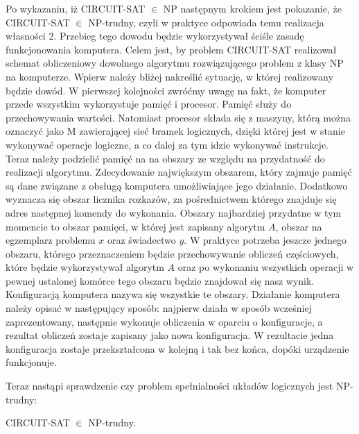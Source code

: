 Po wykazaniu, iż CIRCUIT-SAT $\in$ NP następnym krokiem jest pokazanie, że CIRCUIT-SAT $\in$ NP-trudny, czyli w praktyce odpowiada temu realizacja własności 2. Przebieg tego dowodu będzie wykorzystywał ściśle zasadę funkcjonowania komputera. Celem jest, by problem CIRCUIT-SAT realizował schemat obliczeniowy dowolnego algorytmu rozwiązującego problem z klasy NP na komputerze. Wpierw należy bliżej nakreślić sytuację, w której realizowany będzie dowód. W pierwszej kolejności zwróćmy uwagę na fakt, że komputer przede wszystkim wykorzystuje pamięć i procesor. Pamięć służy do przechowywania wartości. Natomiast procesor składa się z maszyny, którą można oznaczyć jako M zawierającej sieć bramek logicznych, dzięki której jest w stanie  wykonywać operacje logiczne, a co dalej za tym idzie wykonywać instrukcje. Teraz należy podzielić pamięć na na obszary ze względu na przydatność do realizacji algorytmu. Zdecydowanie największym obszarem, który zajmuje pamięć są dane związane z obsługą komputera umożliwiające jego działanie. Dodatkowo wyznacza się obszar licznika rozkazów, za pośrednictwem którego znajduje się adres następnej komendy do wykonania. Obszary najbardziej przydatne w tym momencie to obszar pamięci, w której jest zapisany algorytm $A$, obszar na egzemplarz problemu $x$ oraz świadectwo $y$. W praktyce potrzeba jeszcze jednego obszaru, którego przeznaczeniem będzie przechowywanie obliczeń częściowych, które będzie wykorzystywał algorytm $A$ oraz po wykonaniu wszystkich operacji w pewnej ustalonej komórce tego obszaru będzie znajdował się nasz wynik. Konfiguracją komputera nazywa się wszystkie te obszary. Działanie komputera należy opisać w następujący sposób: najpierw działa w sposób wcześniej zaprezentowany, następnie wykonuje obliczenia w oparciu o konfiguracje, a rezultat obliczeń zostaje zapisany jako nowa konfiguracja. W rezultacie jedna konfiguracja zostaje przekształcona w kolejną i tak bez końca, dopóki urządzenie funkcjonuje.


\newpage
Teraz nastąpi sprawdzenie czy problem spełnialności układów logicznych jest NP-trudny:

\begin{lem}
	CIRCUIT-SAT $\in$ NP-trudny.
\end{lem}

